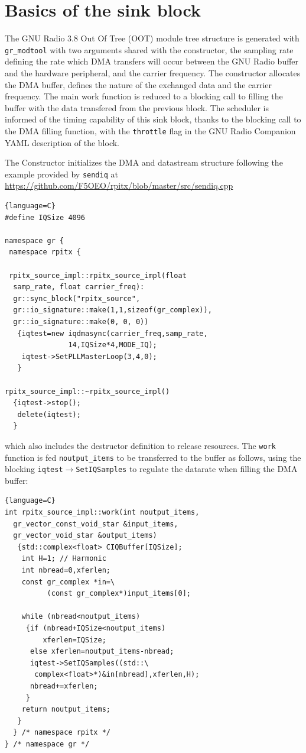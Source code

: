 \documentclass{article}
\begin{document}
\section{Basics of the sink block}

The GNU Radio 3.8 Out Of Tree (OOT) module tree structure is generated with {\tt gr\_modtool}
with two arguments shared with the constructor, the sampling rate defining the rate which
DMA transfers will occur between the GNU Radio buffer and the hardware peripheral, and the
carrier frequency. The constructor allocates the DMA buffer, defines the nature of the exchanged
data and the carrier frequency. The main work function is reduced to a blocking call to filling
the buffer with the data transfered from the previous block. The scheduler is informed of the
timing capability of this sink block, thanks to the blocking call to the DMA filling function,
with the {\tt throttle} flag in the GNU Radio Companion YAML description of the block.

The Constructor initializes the DMA and datastream structure following the example
provided by {\tt sendiq} at \url{https://github.com/F5OEO/rpitx/blob/master/src/sendiq.cpp}

\begin{lstlisting}{language=C}
#define IQSize 4096

namespace gr {
 namespace rpitx {

 rpitx_source_impl::rpitx_source_impl(float 
  samp_rate, float carrier_freq): 
  gr::sync_block("rpitx_source",
  gr::io_signature::make(1,1,sizeof(gr_complex)),
  gr::io_signature::make(0, 0, 0))
   {iqtest=new iqdmasync(carrier_freq,samp_rate,
               14,IQSize*4,MODE_IQ);
    iqtest->SetPLLMasterLoop(3,4,0);
   }

rpitx_source_impl::~rpitx_source_impl()
  {iqtest->stop();
   delete(iqtest);
  }
\end{lstlisting}
which also includes the destructor definition to release resources. The {\tt work}
function is fed {\tt noutput\_items} to be transferred to the buffer as follows, using
the blocking {\tt iqtest$\rightarrow$SetIQSamples} to regulate the datarate when filling 
the DMA buffer:

\begin{lstlisting}{language=C}
int rpitx_source_impl::work(int noutput_items,
  gr_vector_const_void_star &input_items,
  gr_vector_void_star &output_items)
   {std::complex<float> CIQBuffer[IQSize];  
    int H=1; // Harmonic
    int nbread=0,xferlen;
    const gr_complex *in=\
          (const gr_complex*)input_items[0];

    while (nbread<noutput_items)
     {if (nbread+IQSize<noutput_items) 
         xferlen=IQSize; 
      else xferlen=noutput_items-nbread;
      iqtest->SetIQSamples((std::\
       complex<float>*)&in[nbread],xferlen,H);
      nbread+=xferlen;
     }
    return noutput_items;
   }
  } /* namespace rpitx */
} /* namespace gr */
\end{lstlisting}
\end{document}
